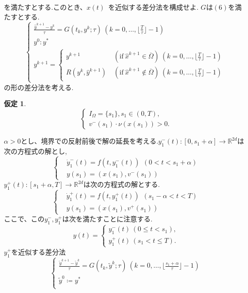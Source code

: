 \documentclass[a4,12pt]{article}
\newtheorem{hyp}{仮定}
\begin{document}
を満たすとする.このとき、$x(t)$ を近似する差分法を構成せよ.
$G$は$(6)$を満たすとする.
\begin{equation}
\begin{cases}
\displaystyle\frac{\hat{y}^{k+1}-y^k}{\tau}=G(t_k,y^k;\tau)\ (k=0,\ldots ,\lfloor\frac{T}{\tau}\rfloor-1)\\
y^0:y^*\\
y^{k+1}=
\begin{cases}
y^{k+1}\ &(\text{if}\ \hat{x}^{k+1}\in\overline{\Omega})\ (k=0,\ldots ,\lfloor\frac{T}{\tau}\rfloor-1)\\
R(y^k,\hat{y}^{k+1})\ &(\text{if}\ \hat{x}^{k+1}\notin\overline{\Omega})\ (k=0,\ldots ,\lfloor\frac{T}{\tau}\rfloor-1)
\end{cases}
\end{cases}
\end{equation}
の形の差分法を考える.
\begin{hyp}
\[\begin{cases}
I_{\Omega}= \{s_1\},s_1\in (0,T),\\
v^{-}(s_1)\cdot\nu(x(s_1))>0.
\end{cases}\]
\end{hyp}
\medskip
$\alpha>0$とし、境界での反射前後で解の延長を考える.$y^{-}_1(t):[0,s_1+\alpha]\rightarrow\mathbb{R}^{2d}$は次の方程式の解とし,
\begin{equation}\left\{\begin{aligned}
    &\dot{y}^{-}_1(t)=f(t,y^{-}_1(t))\ \ (0<t<s_1+\alpha)\\
    &y(s_1)=(x(s_1),v^{-}(s_1))
    \end{aligned}\right.
\end{equation}
$y^{+}_1(t):[s_1+\alpha,T]\rightarrow\mathbb{R}^{2d}$は次の方程式の解とする.
\begin{equation}\left\{\begin{aligned}
    &\dot{y}^{+}_1(t)=f(t,y^{+}_1(t))\ \ (s_1-\alpha<t<T)\\
    &y(s_1)=(x(s_1),v^{+}(s_1))
    \end{aligned}\right.
\end{equation}
ここで、この$y^-_1,y^+_1$は次を満たすことに注意する.
\[y(t)=
\begin{cases}
y^{-}_1(t)\ (0\leq t<s_1),\\
y^{+}_1(t)\ (s_1<t\leq T).
\end{cases}
\]
$y^+_1$を近似する差分法
\[\begin{cases}
\displaystyle\frac{\tilde{y}^{k+1}-\tilde{y}^k}{\tau}=G(t_k,\tilde{y}^k;\tau)\ (k=0,\ldots ,\lfloor\frac{s_1+\alpha}{\tau}\rfloor-1)\\
\tilde{y}^0\coloneqq y^*\\
\end{cases}\]
\end{document}
